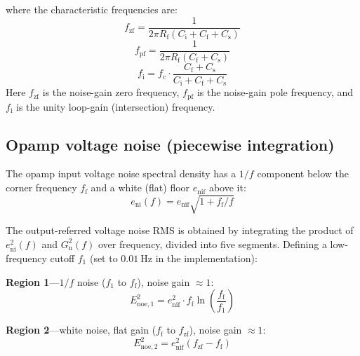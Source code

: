 \documentclass[a4paper,11pt]{article}
\begin{document}
where the characteristic frequencies are:
\begin{equation}
  f_{\mathrm{zf}}
  = \frac{1}{2\pi R_{\mathrm{f}}
    (C_{\mathrm{i}} + C_{\mathrm{f}} + C_{\mathrm{s}})}
  \label{eq:fzf}
\end{equation}
\begin{equation}
  f_{\mathrm{pf}}
  = \frac{1}{2\pi R_{\mathrm{f}}
    (C_{\mathrm{f}} + C_{\mathrm{s}})}
  \label{eq:fpf}
\end{equation}
\begin{equation}
  f_{\mathrm{i}}
  = f_{\mathrm{c}} \cdot
    \frac{C_{\mathrm{f}} + C_{\mathrm{s}}}
         {C_{\mathrm{i}} + C_{\mathrm{f}} + C_{\mathrm{s}}}
  \label{eq:fi}
\end{equation}
Here $f_{\mathrm{zf}}$ is the noise-gain zero frequency,
$f_{\mathrm{pf}}$ is the noise-gain pole frequency, and
$f_{\mathrm{i}}$ is the unity loop-gain (intersection) frequency.

\subsection{Opamp voltage noise (piecewise integration)}

The opamp input voltage noise spectral density has a $1/f$ component
below the corner frequency $f_{\mathrm{f}}$ and a white (flat) floor
$e_{\mathrm{nif}}$ above it:
\begin{equation}
  e_{\mathrm{ni}}(f)
  = e_{\mathrm{nif}} \sqrt{1 + f_{\mathrm{f}} / f}
  \label{eq:eni}
\end{equation}

The output-referred voltage noise RMS is obtained by integrating the
product of $e_{\mathrm{ni}}^2(f)$ and $G_{\mathrm{n}}^2(f)$ over
frequency, divided into five segments.  Defining a low-frequency cutoff
$f_1$ (set to $\SI{0.01}{\hertz}$ in the implementation):

\textbf{Region 1}---$1/f$ noise ($f_1$ to $f_{\mathrm{f}}$), noise
gain $\approx 1$:
\begin{equation}
  E_{\mathrm{noe},1}^2
  = e_{\mathrm{nif}}^2 \cdot f_{\mathrm{f}}
    \ln\!\left(\frac{f_{\mathrm{f}}}{f_1}\right)
  \label{eq:Enoe1}
\end{equation}

\textbf{Region 2}---white noise, flat gain ($f_{\mathrm{f}}$ to
$f_{\mathrm{zf}}$), noise gain $\approx 1$:
\begin{equation}
  E_{\mathrm{noe},2}^2
  = e_{\mathrm{nif}}^2 (f_{\mathrm{zf}} - f_{\mathrm{f}})
  \label{eq:Enoe2}
\end{equation}
\end{document}
